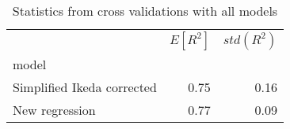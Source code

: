 
\begin{table}[H]
    \centering
    \caption{Statistics from cross validations with all models}
   \begin{tabular}{lrr}
\toprule
{} &  $E[R^2]$ &  $std(R^2)$ \\
model                      &           &             \\
\midrule
Simplified Ikeda corrected &      0.75 &        0.16 \\
New regression             &      0.77 &        0.09 \\
\bottomrule
\end{tabular}

    \label{tab:crossvalidation}
\end{table}
    